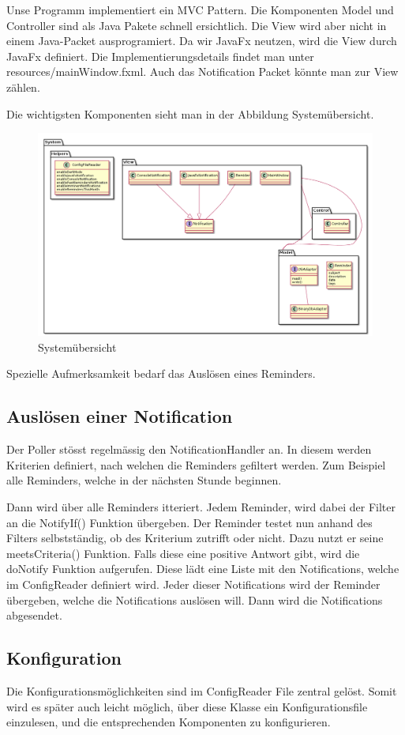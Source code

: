 Unse Programm implementiert ein MVC Pattern. Die Komponenten Model und Controller sind als Java Pakete schnell ersichtlich. Die View wird aber nicht in einem Java-Packet  ausprogramiert. Da wir JavaFx neutzen, wird die View durch JavaFx definiert. Die Implementierungsdetails findet man unter resources/mainWindow.fxml. Auch das Notification Packet könnte man zur View zählen.

Die wichtigsten Komponenten sieht man in der Abbildung Systemübersicht.
\begin{landscape}
\begin{figure}
  \centering
    \includegraphics[width=1\textwidth]{../uml/uebersicht01.png}
  \caption{Systemübersicht}
  \label{fig:overview}
\end{figure}
\end{landscape}

Spezielle Aufmerksamkeit bedarf das Auslösen eines Reminders.
\subsection{Auslösen einer Notification}

Der Poller stösst regelmässig den NotificationHandler an.
In diesem werden Kriterien definiert, nach welchen die Reminders gefiltert werden.  Zum Beispiel alle Reminders, welche in der nächsten Stunde beginnen.



Dann wird über alle Reminders itteriert. Jedem Reminder, wird dabei der Filter an die NotifyIf() Funktion übergeben.
Der Reminder testet nun anhand des Filters selbstständig, ob des Kriterium zutrifft oder nicht. Dazu nutzt er seine meetsCriteria() Funktion.
Falls diese eine positive Antwort gibt, wird die doNotify Funktion aufgerufen. Diese lädt eine Liste mit den Notifications, welche im ConfigReader definiert wird. Jeder dieser Notifications wird der Reminder übergeben, welche die Notifications auslösen will. Dann wird die Notifications abgesendet.

\subsection{Konfiguration}
Die Konfigurationsmöglichkeiten sind im ConfigReader File zentral gelöst. Somit wird es später auch leicht möglich, über diese Klasse ein Konfigurationsfile  einzulesen, und die entsprechenden Komponenten zu konfigurieren.
